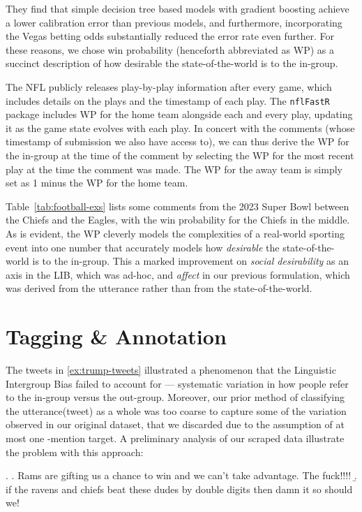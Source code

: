 They find that simple decision tree based models with gradient boosting achieve a lower calibration error than previous models, and furthermore, incorporating the Vegas betting odds substantially reduced the error rate even further. For these reasons, we chose win probability (henceforth abbreviated as WP) as a succinct description of how desirable the state-of-the-world is to the in-group.

The NFL publicly releases play-by-play information after every game, which includes details on the plays and the timestamp of each play. The \texttt{nflFastR} package includes WP for the home team alongside each and every play, updating it as the game state evolves with each play. In concert with the comments (whose timestamp of submission we also have access to), we can thus derive the WP for the in-group at the time of the comment by selecting the WP for the most recent play at the time the comment was made. The WP for the away team is simply set as 1 minus the WP for the home team. 

Table~\ref{tab:football-exs} lists some comments from the 2023 Super Bowl between the Chiefs and the Eagles, with the win probability for the Chiefs in the middle. As is evident, the WP cleverly models the complexities of a real-world sporting event into one number that accurately models how \emph{desirable} the state-of-the-world is to the in-group. This a marked improvement on \emph{social desirability} as an axis in the LIB, which was ad-hoc, and \emph{affect} in our previous formulation, which was derived from the utterance rather than from the state-of-the-world.

 


\section{Tagging \& Annotation}
\label{sec:football-prelim}

The tweets in \ref{ex:trump-tweets} illustrated a phenomenon that the Linguistic Intergroup Bias failed to account for --- systematic variation in how people refer to the in-group versus the out-group. Moreover, our prior method of classifying the utterance(tweet) as a whole was too coarse to capture some of the variation observed in our original dataset, that we discarded due to the assumption of at most one \@-mention target. A preliminary analysis of our scraped data illustrate the problem with this approach:

\ex. \label{ex:mult-football} \a. \label{ex:mult-football-a} Rams are gifting us a chance to win and we can’t take advantage. The fuck!!!!
     \b. \label{ex:mult-football-b} if the ravens and chiefs beat these dudes by double digits then damn it so should we!
     
